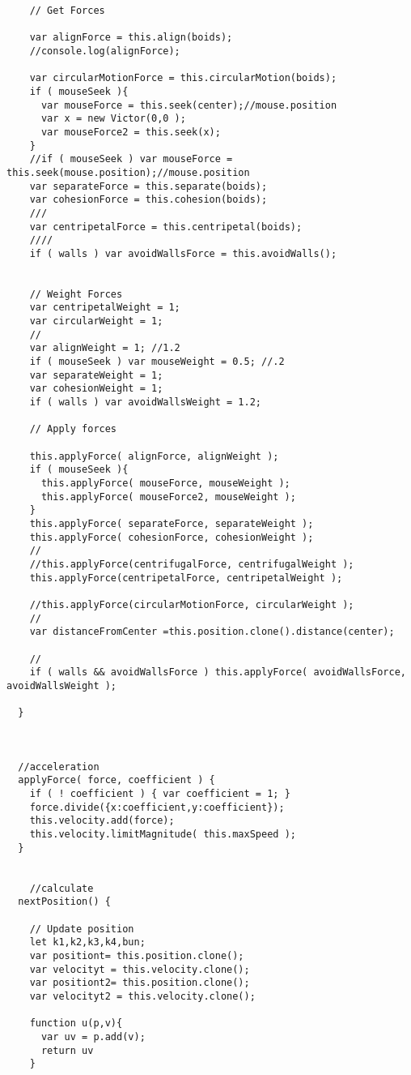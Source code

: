 \begin{lstlisting}
    // Get Forces

    var alignForce = this.align(boids);
    //console.log(alignForce);

    var circularMotionForce = this.circularMotion(boids);
    if ( mouseSeek ){ 
      var mouseForce = this.seek(center);//mouse.position
      var x = new Victor(0,0 );
      var mouseForce2 = this.seek(x);
    }
    //if ( mouseSeek ) var mouseForce = this.seek(mouse.position);//mouse.position
    var separateForce = this.separate(boids);
    var cohesionForce = this.cohesion(boids);
    ///
    var centripetalForce = this.centripetal(boids);
    ////
    if ( walls ) var avoidWallsForce = this.avoidWalls();


    // Weight Forces
    var centripetalWeight = 1;
    var circularWeight = 1;
    //
    var alignWeight = 1; //1.2
    if ( mouseSeek ) var mouseWeight = 0.5; //.2
    var separateWeight = 1;
    var cohesionWeight = 1;
    if ( walls ) var avoidWallsWeight = 1.2;

    // Apply forces
    
    this.applyForce( alignForce, alignWeight );
    if ( mouseSeek ){ 
      this.applyForce( mouseForce, mouseWeight );
      this.applyForce( mouseForce2, mouseWeight );
    }
    this.applyForce( separateForce, separateWeight );
    this.applyForce( cohesionForce, cohesionWeight );
    //
    //this.applyForce(centrifugalForce, centrifugalWeight );
    this.applyForce(centripetalForce, centripetalWeight );

    //this.applyForce(circularMotionForce, circularWeight );
    //
    var distanceFromCenter =this.position.clone().distance(center);
    
    //
    if ( walls && avoidWallsForce ) this.applyForce( avoidWallsForce, avoidWallsWeight );

  }



  //acceleration
  applyForce( force, coefficient ) {
    if ( ! coefficient ) { var coefficient = 1; }
    force.divide({x:coefficient,y:coefficient});
    this.velocity.add(force);
    this.velocity.limitMagnitude( this.maxSpeed );
  }


    //calculate
  nextPosition() {

    // Update position
    let k1,k2,k3,k4,bun;
    var positiont= this.position.clone(); 
    var velocityt = this.velocity.clone();
    var positiont2= this.position.clone(); 
    var velocityt2 = this.velocity.clone();

    function u(p,v){
      var uv = p.add(v);
      return uv
    }


\end{lstlisting}
